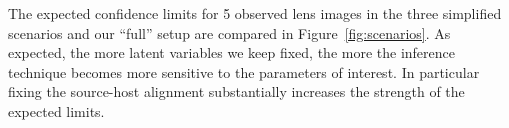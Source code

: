 \documentclass[twocolumn]{aastex63}
\begin{document}
The expected confidence limits for 5 observed lens images in the three simplified scenarios and our ``full'' setup are compared in Figure~\ref{fig:scenarios}. As expected, the more latent variables we keep fixed, the more the inference technique becomes more sensitive to the parameters of interest. In particular fixing the source-host alignment substantially increases the strength of the expected limits.



\end{document}
